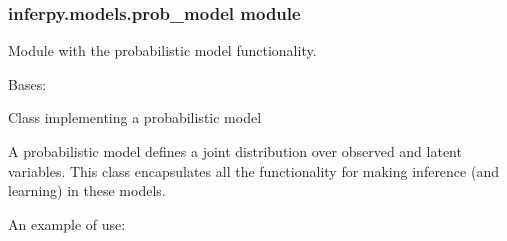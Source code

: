 \documentclass[letterpaper,10pt,english]{sphinxmanual}
\begin{document}
\subsubsection{inferpy.models.prob\_model module}
\label{\detokenize{modules/inferpy.models:inferpy-models-prob-model-module}}\label{\detokenize{modules/inferpy.models:module-inferpy.models.prob_model}}
Module with the probabilistic model functionality.

\begin{fulllineitems}
\label{\detokenize{modules/inferpy.models:inferpy.models.prob_model.ProbModel}}
Bases: 

Class implementing a probabilistic model

A probabilistic model defines a joint distribution over observed and latent variables. This
class encapsulates all the functionality for making inference (and learning) in these models.

An example of use:

\begin{sphinxVerbatim}[commandchars=\\\{\}]
   
   



   

         
         




\end{sphinxVerbatim}
\end{fulllineitems}
\end{document}
